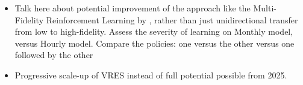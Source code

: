 \begin{itemize}
\item Talk here about potential improvement of the approach like the Multi-Fidelity Reinforcement Learning by \citet{cutler2014reinforcement}, rather than just unidirectional transfer from low to high-fidelity. Assess the severity of learning on Monthly model, versus Hourly model. Compare the policies: one versus the other versus one followed by the other

\item Progressive scale-up of \gls{VRES} instead of full potential possible from 2025.
\end{itemize}
